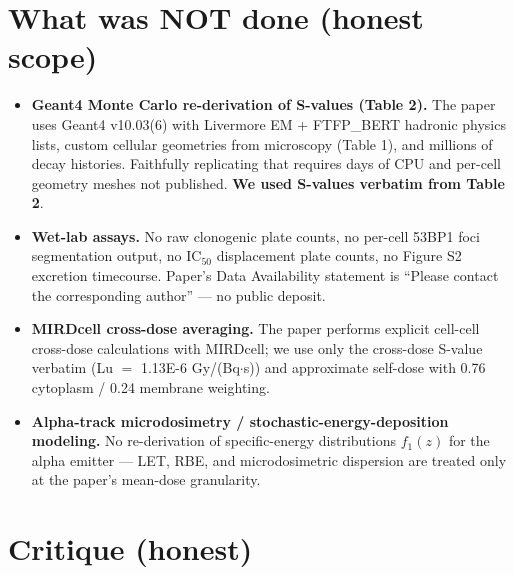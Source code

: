 \documentclass[11pt]{article}
\begin{document}
\section{What was NOT done (honest scope)}
\begin{itemize}
  \item \textbf{Geant4 Monte Carlo re-derivation of S-values (Table 2).} The paper
        uses Geant4 v10.03(6) with Livermore EM + FTFP\_BERT hadronic physics
        lists, custom cellular geometries from microscopy (Table 1), and millions
        of decay histories. Faithfully replicating that requires days of CPU and
        per-cell geometry meshes not published. \textbf{We used S-values verbatim
        from Table 2}.
  \item \textbf{Wet-lab assays.} No raw clonogenic plate counts, no per-cell 53BP1
        foci segmentation output, no IC$_{50}$ displacement plate counts, no
        Figure S2 excretion timecourse. Paper's Data Availability statement is
        ``Please contact the corresponding author'' --- no public deposit.
  \item \textbf{MIRDcell cross-dose averaging.} The paper performs explicit
        cell-cell cross-dose calculations with MIRDcell; we use only the
        cross-dose S-value verbatim (Lu $=$ 1.13E-6 Gy/(Bq$\cdot$s)) and
        approximate self-dose with 0.76 cytoplasm / 0.24 membrane weighting.
  \item \textbf{Alpha-track microdosimetry / stochastic-energy-deposition modeling.}
        No re-derivation of specific-energy distributions $f_1(z)$ for the alpha
        emitter --- LET, RBE, and microdosimetric dispersion are treated only at
        the paper's mean-dose granularity.
\end{itemize}

\section{Critique (honest)}
\label{sec:critique}
\end{document}
